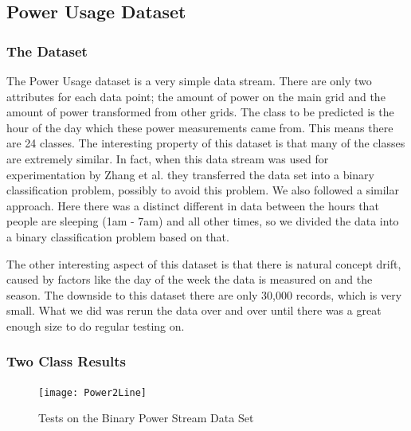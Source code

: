 \documentclass[12pt,a4paper,oneside]{report}
\begin{document}
\subsection*{Power Usage Dataset}
\subsubsection*{The Dataset}
The Power Usage dataset is a very simple data stream. There are only two attributes for each data point; the amount of power on the main grid and the amount of power transformed from other grids. The class to be predicted is the hour of the day which these power measurements came from. This means there are 24 classes. The interesting property of this dataset is that many of the classes are extremely similar. In fact, when this data stream was used for experimentation by Zhang et al.\cite{Zhang} they transferred the data set into a binary classification problem, possibly to avoid this problem. We also followed a similar approach. Here there was a distinct different in data between the hours that people are sleeping (1am - 7am) and all other times, so we divided the data into a binary classification problem based on that. 

The other interesting aspect of this dataset is that there is natural concept drift, caused by factors like the  day of the week the data is measured on and the season. The downside to this dataset there are only 30,000 records, which is very small. What we did was rerun the data over and over until there was a great enough size to do regular testing on. 
\subsubsection*{Two Class Results}

\begin{figure}
\texttt{[image: Power2Line]}
\caption{Tests on the Binary Power Stream Data Set}
\end{figure}
\end{document}
